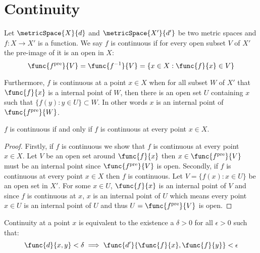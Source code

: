 \section{Continuity}
\begin{definition} [Continuity]
    Let \(\metricSpace{X}{d}\) and \(\metricSpace{X'}{d'}\) be two metric spaces and \(f : X \to X'\) is a function. We say \(f\) is continuous if for every open subset \(V\) of \(X'\) the pre-image of it is an open in \(X\):
    \[\func{f^{\mathrm{pre}}}{V}= \func{f^{-1}}{V} = \{ x \in X : \func{f}{x} \in V\} \]

    Furthermore, \(f\) is continuous at a point \(x \in X\) when for all subset \(W\) of  \(X'\) that \( \func{f}{x} \) is a internal point of \(W\), then there is an open set \(U\) containing \(x\) such that \(\{ f(y) : y \in U \} \subset W\). In other words \(x\) is an internal point of \(\func{f^{\mathrm{pre}}}{W}\).
\end{definition}

\begin{proposition}
    \(f\) is continuous if and only if \(f\) is continuous at every point \(x \in X\).
\end{proposition}

\begin{proof}
    Firstly, if \(f\) is continuous we show that \(f\) is continuous at every point \(x \in X\). Let \(V\) be an open set around \( \func{f}{x}\) then \(x \in \func{f^{\mathrm{pre}}}{V}\) must be an internal point since \(\func{f^{\mathrm{pre}}}{V}\) is open.
    Secondly, if \(f\) is continuous at every point \(x \in X\) then \(f\) is continuous. Let \(V = \{f(x) : x \in U\}\) be an open set in \(X'\). For some \(x \in U\), \(\func{f}{x}\) is an internal point of \(V\) and since \(f\) is continuous at \(x\), \(x\) is an internal point of \(U\) which means every point \(x \in U\) is an internal point of \(U\) and thus \(U = \func{f^{\mathrm{pre}}}{V}\) is open.
\end{proof}

\begin{theorem} 
    Continuity at a point \(x\) is equivalent to the existence a \(\delta > 0\) for all \(\epsilon > 0\) such that:
    \[\func{d}{x,y} < \delta \implies \func{d'}{\func{f}{x},\func{f}{y}} < \epsilon \]
\end{theorem}

